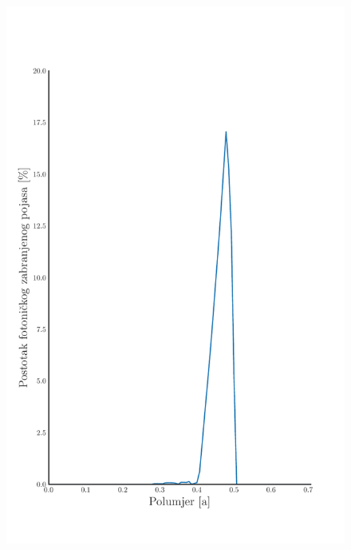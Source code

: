 \documentclass{beamer}
\begin{document}
\begin{frame}
\begin{itemize}
\begin{columns}
\begin{figure}[ht]
    		\includegraphics[width=\linewidth]
    			{./images/pdf/optimization_cylinder.pdf}
		\end{figure}
	\end{columns}
	\end{itemize}
\end{frame}
\end{document}
